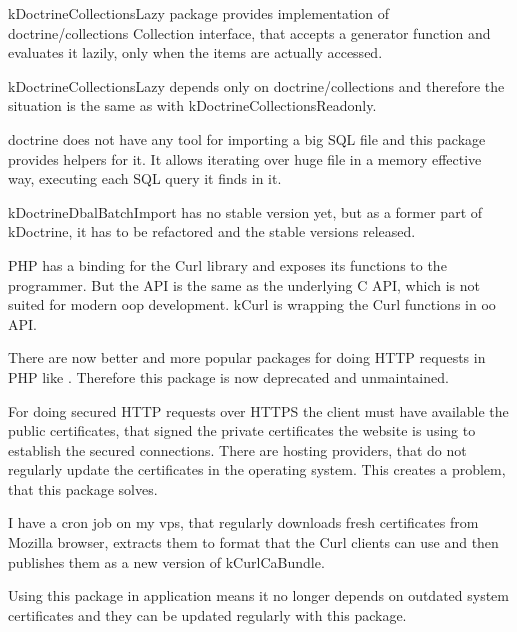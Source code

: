  \label{sec:state:doctrine-collections-lazy}

\Gls{kDoctrineCollectionsLazy} package provides implementation of doctrine/collections Collection interface, that accepts a generator function and evaluates it lazily, only when the items are actually accessed.

\gls{kDoctrineCollectionsLazy} depends only on doctrine/collections and therefore the situation is the same as with \gls{kDoctrineCollectionsReadonly}.

 \label{sec:state:doctrine-dbal-batch-import}

\Gls{doctrine} does not have any tool for importing a big SQL file and this package provides helpers for it. It allows iterating over huge file in a memory effective way, executing each SQL query it finds in it.

\gls{kDoctrineDbalBatchImport} has no stable version yet, but as a former part of \gls{kDoctrine}, it has to be refactored and the stable versions released.

 \label{sec:state:curl}

PHP has a binding for the Curl library and exposes its functions to the programmer. But the API is the same as the underlying C API, which is not suited for modern \gls{oop} development. \gls{kCurl} is wrapping the Curl functions in \gls{oo} API.

There are now better and more popular packages for doing HTTP requests in PHP like . Therefore this package is now deprecated and unmaintained.

 \label{sec:state:curl-ca-bundle}

For doing secured HTTP requests over HTTPS the client must have available the public certificates, that signed the private certificates the website is using to establish the secured connections. There are hosting providers, that do not regularly update the certificates in the operating system. This creates a problem, that this package solves.

I have a cron job on my \gls{vps}, that regularly downloads fresh certificates from Mozilla browser, extracts them to format that the Curl clients can use and then publishes them as a new version of \gls{kCurlCaBundle}.

Using this package in application means it no longer depends on outdated system certificates and they can be updated regularly with this package.

